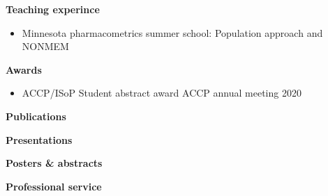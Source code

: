 \documentclass[a4paper,11pt]{article}
\begin{document}
\textbf{Teaching experince} \\
\begin{itemize}
\item Minnesota pharmacometrics summer school: Population approach and NONMEM 
\end{itemize}

\textbf{Awards} \\
\begin{itemize}
\item ACCP/ISoP Student abstract award \hfill ACCP annual meeting 2020
\end{itemize}

\textbf{Publications}

\textbf{Presentations}

\textbf{Posters \& abstracts}

\textbf{Professional service}
\end{document}
